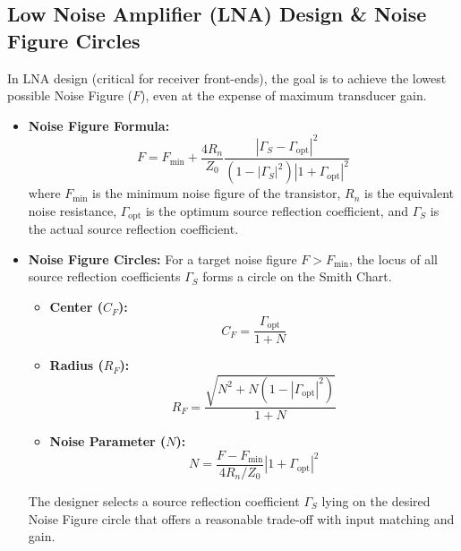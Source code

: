 \documentclass[12pt,a4paper]{article}
\begin{document}
\subsection{Low Noise Amplifier (LNA) Design \& Noise Figure Circles}
In LNA design (critical for receiver front-ends), the goal is to achieve the lowest possible Noise Figure ($F$), even at the expense of maximum transducer gain.
\begin{itemize}[leftmargin=*, itemsep=3pt]
  \item \textbf{Noise Figure Formula:}
    \begin{equation}
      F = F_{\text{min}} + \frac{4 R_n}{Z_0} \frac{|\Gamma_S - \Gamma_{\text{opt}}|^2}{(1 - |\Gamma_S|^2) |1 + \Gamma_{\text{opt}}|^2}
    \end{equation}
    where $F_{\text{min}}$ is the minimum noise figure of the transistor, $R_n$ is the equivalent noise resistance, $\Gamma_{\text{opt}}$ is the optimum source reflection coefficient, and $\Gamma_S$ is the actual source reflection coefficient.
  \item \textbf{Noise Figure Circles:} For a target noise figure $F > F_{\text{min}}$, the locus of all source reflection coefficients $\Gamma_S$ forms a circle on the Smith Chart.
    \begin{itemize}[leftmargin=*, itemsep=2.5pt, topsep=0pt]
      \item \textbf{Center ($C_F$):}
        \begin{equation}
          C_F = \frac{\Gamma_{\text{opt}}}{1 + N}
        \end{equation}
      \item \textbf{Radius ($R_F$):}
        \begin{equation}
          R_F = \frac{\sqrt{N^2 + N(1 - |\Gamma_{\text{opt}}|^2)}}{1 + N}
        \end{equation}
      \item \textbf{Noise Parameter ($N$):}
        \begin{equation}
          N = \frac{F - F_{\text{min}}}{4 R_n/Z_0} |1 + \Gamma_{\text{opt}}|^2
        \end{equation}
    \end{itemize}
    The designer selects a source reflection coefficient $\Gamma_S$ lying on the desired Noise Figure circle that offers a reasonable trade-off with input matching and gain.
\end{itemize}

\end{document}
